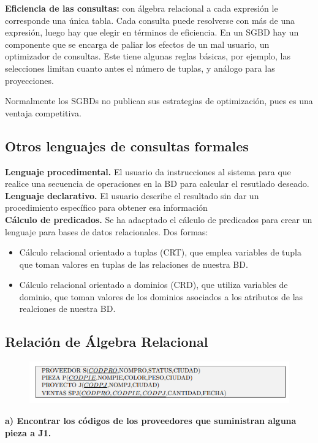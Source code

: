 \documentclass[a4paper,11pt]{article}
\begin{document}
\textbf{Eficiencia de las consultas:} con álgebra relacional a cada expresión le corresponde una única tabla. Cada consulta puede resolverse con más de una expresión, luego hay que elegir en términos de eficiencia. En un SGBD hay un componente que se encarga de paliar los efectos de un mal usuario, un optimizador de consultas. Este tiene algunas reglas básicas, por ejemplo, las selecciones limitan cuanto antes el número de tuplas, y análogo para las proyecciones. 

Normalmente los SGBDs no publican sus estrategias de optimización, pues es una ventaja competitiva. \\

\subsection{Otros lenguajes de consultas formales}
\textbf{Lenguaje procedimental.} El usuario da instrucciones al sistema para que realice una secuencia de operaciones en la BD para calcular el resutlado deseado. \\

\textbf{Lenguaje declarativo.} El usuario describe el resultado sin dar un procedimiento específico para obtener esa información \\

\textbf{Cálculo de predicados.} Se ha adacptado el cálculo de predicados para crear un lenguaje para bases de datos relacionales. Dos formas:

\begin{itemize}
\item Cálculo relacional orientado a tuplas (CRT), que emplea variables de tupla que toman valores en tuplas de las relaciones de nuestra BD. 

\item Cálculo relacional orientado a dominios (CRD), que utiliza variables de dominio, que toman valores de los dominios asociados a los atributos de las realciones de nuestra BD.
\end{itemize}

\subsection{Relación de Álgebra Relacional}
\begin{figure}[h]
\centering
\includegraphics[scale=1,width=1\textwidth]{ejer1.png}
\end{figure}
\textbf{a) Encontrar los códigos de los proveedores que suministran alguna pieza a J1.}
\end{document}
